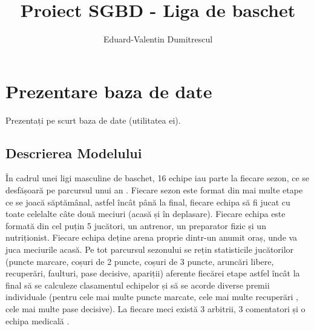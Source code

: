 \documentclass{article}
\author{Eduard-Valentin Dumitrescul}
\title{Proiect SGBD - Liga de baschet}
\begin{document}
\maketitle

\pagebreak
\tableofcontents
\pagebreak

\section{Prezentare baza de date}
	Prezentați pe scurt baza de date (utilitatea ei).
\subsection{Descrierea Modelului}
	În cadrul unei ligi masculine de baschet, 16 echipe iau parte la fiecare sezon, ce se desfășoară pe parcursul unui an . Fiecare sezon este format din mai multe etape ce se joacă săptămânal, astfel încât până la final, fiecare echipa să fi jucat cu toate celelalte câte două meciuri (acasă și în deplasare). 
	Fiecare echipa este formată din cel puțin 5 jucători, un antrenor, un preparator fizic și un nutriționist. Fiecare echipa deține arena proprie dintr-un anumit oraș, unde va juca meciurile acasă. Pe tot parcursul sezonului se rețin statisticile jucătorilor (puncte marcare, coșuri de 2 puncte, coșuri de 3 puncte, aruncări libere, recuperări, faulturi, pase decisive, apariții) aferente fiecărei etape astfel încât la final să se calculeze clasamentul echipelor și să se acorde diverse premii individuale (pentru cele mai multe puncte marcate, cele mai multe recuperări , cele mai multe pase decisive). La fiecare meci există 3 arbitrii, 3 comentatori și o echipa medicală .
\end{document}
